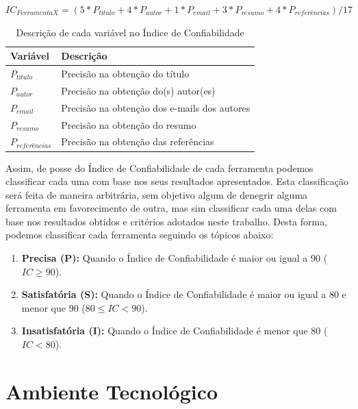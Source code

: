 \begin{center}
    $ IC_{Ferramenta X}=(5*P_{título}+4*P_{autor}+1*P_{email}+3*P_{resumo}+4*P_{referências}) / 17 $
\end{center}

\begin{table}
    \caption{Descrição de cada variável no Índice de Confiabilidade}
    \begin{center}
        \begin{tabular}{|p{3cm}|p{8cm}|}
            \hline \textbf{Variável} & \textbf{Descrição}\\ 
            \hline $P_{título}$ & Precisão na obtenção do título \\
            \hline $P_{autor}$ & Precisão na obtenção do(s) autor(es)\\
            \hline $P_{email}$ & Precisão na obtenção dos e-mails dos autores \\
            \hline $P_{resumo}$ & Precisão na obtenção do resumo \\
            \hline $P_{referências}$ & Precisão na obtenção das referências \\
            \hline 
        \end{tabular} 
    \end{center}
    \label{tab:confiability-index}
\end{table}

\newpage

Assim, de posse do Índice de Confiabilidade de cada ferramenta podemos classificar cada uma com base nos seus resultados apresentados. Esta classificação será feita de maneira arbitrária, sem objetivo algum de denegrir alguma ferramenta em favorecimento de outra, mas sim classificar cada uma delas com base nos resultados obtidos e critérios adotados neste trabalho. Desta forma, podemos classificar cada ferramenta seguindo os tópicos abaixo:

\begin{enumerate}
    \item \textbf{Precisa (P):} Quando o Índice de Confiabilidade é maior ou igual a 90 ($IC\geq90$).
    \item \textbf{Satisfatória (S):} Quando o Índice de Confiabilidade é maior ou igual a 80 e menor que 90 ($80 \leq IC < 90$).
    \item \textbf{Insatisfatória (I):} Quando o Índice de Confiabilidade é menor que 80 ($IC < 80$).
\end{enumerate}

\section{Ambiente Tecnológico}
\label{sec:tech-environment}

